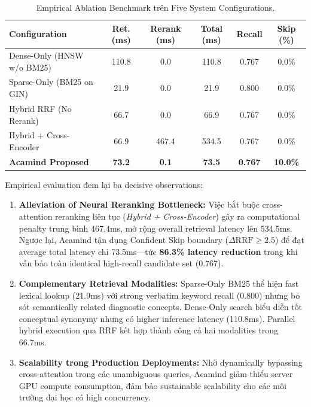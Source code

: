\documentclass[10pt]{SPIIRAS_Proceedings}
\begin{document}
\begin{table}[!t]
\centering
\caption{Empirical Ablation Benchmark trên Five System Configurations.}
\label{tab:ablation}
\scriptsize
\setlength{\tabcolsep}{2.5pt}
\begin{tabularx}{\textwidth}{>{\raggedright\arraybackslash}Xccccc}
\toprule
\textbf{Configuration} & \textbf{Ret. (ms)} & \textbf{Rerank (ms)} & \textbf{Total (ms)} & \textbf{Recall} & \textbf{Skip (\%)} \\
\midrule
Dense-Only (HNSW w/o BM25) & 110.8 & 0.0 & 110.8 & 0.767 & 0.0\% \\
Sparse-Only (BM25 on GIN) & 21.9 & 0.0 & 21.9 & 0.800 & 0.0\% \\
Hybrid RRF (No Rerank) & 66.7 & 0.0 & 66.9 & 0.767 & 0.0\% \\
Hybrid + Cross-Encoder & 66.9 & 467.4 & 534.5 & 0.767 & 0.0\% \\
\midrule
\textbf{Acamind Proposed} & \textbf{73.2} & \textbf{0.1} & \textbf{73.5} & \textbf{0.767} & \textbf{10.0\%} \\
\bottomrule
\end{tabularx}
\end{table}

Empirical evaluation đem lại ba decisive observations:
\begin{enumerate}
    \item \textbf{Alleviation of Neural Reranking Bottleneck:} Việc bắt buộc cross-attention reranking liên tục (\textit{Hybrid + Cross-Encoder}) gây ra computational penalty trung bình 467.4ms, mở rộng overall retrieval latency lên 534.5ms. Ngược lại, Acamind tận dụng Confident Skip boundary ($\Delta\text{RRF} \ge 2.5$) để đạt average total latency chỉ 73.5ms---tức \textbf{86.3\% latency reduction} trong khi vẫn bảo toàn identical high-recall candidate set (0.767).
    \item \textbf{Complementary Retrieval Modalities:} Sparse-Only BM25 thể hiện fast lexical lookup (21.9ms) với strong verbatim keyword recall (0.800) nhưng bỏ sót semantically related diagnostic concepts. Dense-Only search biểu diễn tốt conceptual synonymy nhưng có higher inference latency (110.8ms). Parallel hybrid execution qua RRF kết hợp thành công cả hai modalities trong 66.7ms.
    \item \textbf{Scalability trong Production Deployments:} Nhờ dynamically bypassing cross-attention trong các unambiguous queries, Acamind giảm thiểu server GPU compute consumption, đảm bảo sustainable scalability cho các môi trường đại học có high concurrency.
\end{enumerate}
\end{document}
